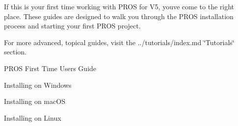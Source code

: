 If this is your first time working with P\+R\+OS for V5, you\textquotesingle{}ve come to the right place. These guides are designed to walk you through the P\+R\+OS installation process and starting your first P\+R\+OS project.

For more advanced, topical guides, visit the ../tutorials/index.md \char`\"{}\+Tutorials\char`\"{} section.


\begin{DoxyItemize}
\item P\+R\+OS First Time Users Guide
\end{DoxyItemize}


\begin{DoxyItemize}
\item Installing on Windows
\item Installing on mac\+OS
\item Installing on Linux 
\end{DoxyItemize}